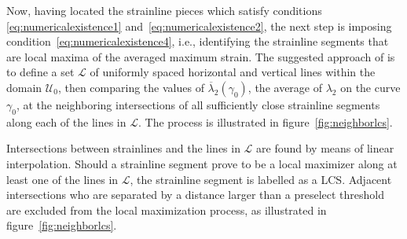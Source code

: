 


Now, having located the strainline pieces which satisfy conditions
\eqref{eq:numericalexistence1} and~\eqref{eq:numericalexistence2}, the next
step is imposing condition~\eqref{eq:numericalexistence4}, i.e., identifying the
strainline segments that are local maxima of the averaged maximum strain. The
suggested approach of \textcite{farazmand2012computing} is to define a set
$\mathcal{L}$ of uniformly spaced horizontal and vertical lines within the
domain $\mathcal{U}_{0}$, then comparing the values of
$\overline{\lambda}_{2}(\gamma_{0})$, the average of $\lambda_{2}$ on the curve
$\gamma_{0}$, at the neighboring intersections of all sufficiently close
strainline segments along each of the lines in $\mathcal{L}$. The process is
illustrated in figure~\ref{fig:neighborlcs}.



Intersections between strainlines and the lines in $\mathcal{L}$ are found
by means of linear interpolation. Should a strainline segment prove to be a
local maximizer along at least one of the lines in $\mathcal{L}$, the strainline
segment is labelled as a LCS\@. Adjacent intersections who are separated by a
distance larger than a preselect threshold are excluded from the local
maximization process, as illustrated in figure~\ref{fig:neighborlcs}.
